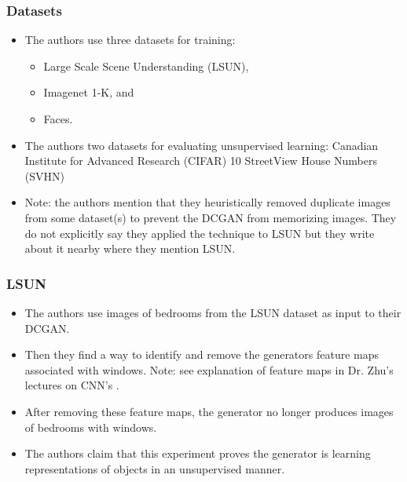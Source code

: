 \documentclass{beamer}
\begin{document}
\begin{frame}
\frametitle{Datasets}
\begin{itemize}
  \item The authors use three datasets for training:
  \begin{itemize}
    \item Large Scale Scene Understanding (LSUN),
    \item Imagenet 1-K, and
    \item Faces.
  \end{itemize}  
  \item The authors two datasets for evaluating unsupervised learning: Canadian 
    Institute for Advanced Research (CIFAR) 10 StreetView House Numbers (SVHN)
  \item Note: the authors mention that they heuristically removed duplicate
    images from some dataset(s) to prevent the DCGAN from memorizing images.
   They do not explicitly say they applied the technique to LSUN but they write
   about it nearby where they mention LSUN.
\end{itemize}
\end{frame}


\begin{frame}
\frametitle{LSUN}
\begin{itemize}
  \item The authors use images of bedrooms from the LSUN dataset
  \cite{lsunDataset} as input to their DCGAN.

  \item Then they find a way to identify and remove the generators feature maps
  \cite{repLearnDcgan} associated with windows.  Note: see explanation of feature
  maps in Dr. Zhu's lectures on CNN's \cite{cnnlecture}. 

  \item After removing these feature maps, the generator no longer produces images
    of bedrooms with windows.

  \item The authors claim that this experiment proves the generator is learning
   representations of objects in an unsupervised manner. 
\end{itemize}
\end{frame}

\end{document}
